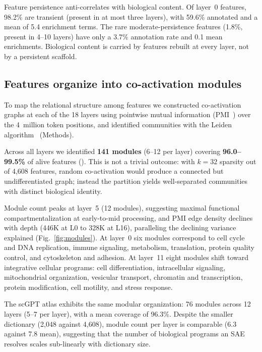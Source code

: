 Feature persistence anti-correlates with biological content. Of layer~0 features, 98.2\% are
transient (present in at most three layers), with 59.6\% annotated and a mean of 5.4 enrichment
terms. The rare moderate-persistence features (1.8\%, present in 4--10 layers) have only a 3.7\%
annotation rate and 0.1 mean enrichments. Biological content is carried by features rebuilt at
every layer, not by a persistent scaffold.

\subsection*{Features organize into co-activation modules}
\label{sec:modules}

To map the relational structure among features we constructed co-activation graphs at each of the
18 layers using pointwise mutual information (PMI~\cite{manning1999foundations}) over the 4~million
token positions, and identified communities with the Leiden algorithm~\cite{traag2019louvain}
(Methods).

Across all layers we identified \textbf{141 modules} (6--12 per layer) covering
\textbf{96.0--99.5\%} of alive features (). This is not a trivial outcome: with $k{=}32$ sparsity out
of 4,608 features, random co-activation would produce a connected but undifferentiated graph;
instead the partition yields well-separated communities with distinct biological identity.

Module count peaks at layer~5 (12 modules), suggesting maximal functional compartmentalization at
early-to-mid processing, and PMI edge density declines with depth (446K at L0 to 328K at L16),
paralleling the declining variance explained (Fig.~\ref{fig:modules}). At layer~0 six modules
correspond to cell cycle and DNA replication, immune signaling, metabolism, translation, protein
quality control, and cytoskeleton and adhesion. At layer~11 eight modules shift toward integrative
cellular programs: cell differentiation, intracellular signaling, mitochondrial organization,
vesicular transport, chromatin and transcription, protein modification, cell motility, and stress
response.

The scGPT atlas exhibits the same modular organization: 76 modules across 12 layers (5--7 per
layer), with a mean coverage of 96.3\%. Despite the smaller dictionary (2,048 against 4,608),
module count per layer is comparable (6.3 against 7.8 mean), suggesting that the number of
biological programs an SAE resolves scales sub-linearly with dictionary size.

